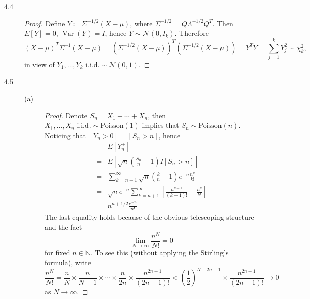 \documentclass{article}
\newcommand{\nn}{\mathbb{N}}
\DeclareMathOperator*{\Var}{Var}
\theoremstyle{definition}
\theoremstyle{plain}
\theoremstyle{remark}
\newtheorem*{rem}{Remark}
\begin{document}
\begin{description}
\begin{comment}
\begin{rem}
The more classical proof of the statement that the characteristic function of a random variable uniquely determines its distribution is given in Theorem 26.2 in \cite{billingsley95}, known as \emph{inversion and the uniqueness theorem}.
\end{rem}
\end{comment}

\item[4.4]
\begin{proof}
Define $Y \coloneqq \Sigma^{-1/2}(X - \mu)$, where $\Sigma^{-1/2} = Q\Lambda^{-1/2}Q^T$. Then $E[Y] = 0$, $\Var(Y) = I$, hence $Y \sim \mathcal{N}(0, I_k)$. Therefore
$$(X - \mu)^T\Sigma^{-1}(X - \mu) = (\Sigma^{-1/2}(X - \mu))^T(\Sigma^{-1/2}(X - \mu)) = Y^T Y = \sum_{j = 1}^k Y_j^2 \sim \chi_k^2,$$
in view of $Y_1, \ldots, Y_k \text{ i.i.d.} \sim \mathcal{N}(0, 1)$.
\end{proof}

\item[4.5]
\begin{description}
\item[(a)]
\begin{proof}
Denote $S_n = X_1 + \cdots + X_n$, then $X_1, \ldots, X_n \text{ i.i.d.} \sim \text{Poisson}(1)$ implies that $S_n \sim \text{Poisson}(n)$. Noticing that $[Y_n > 0] = [S_n > n]$, hence
\begin{align*}
& E[Y_n^+] \\
= & E\left[\sqrt{n}\left(\frac{S_n}{n} - 1\right)I[S_n > n]\right] \\
= & \sum_{k = n + 1}^\infty \sqrt{n} \left(\frac{k}{n} - 1\right) e^{-n}\frac{n^k}{k!} \\
= & \sqrt{n} e^{-n} \sum_{k = n + 1}^\infty \left[\frac{n^{k - 1}}{(k - 1)!} - \frac{n^k}{k!}
\right]\\
= & n^{n + 1/2}\frac{e^{-n}}{n!}
\end{align*}
The last equality holds because of the obvious telescoping structure and the fact 
\begin{equation*}
    \lim_{N \to \infty} \frac{n^N}{N!} = 0
\end{equation*}
for fixed $n \in \nn$. To see this (without applying the Stirling's formula), write
\begin{equation*}
    \frac{n^N}{N!} = \frac{n}{N} \times \frac{n}{N - 1} \times \cdots \times \frac{n}{2n}
    \times \frac{n^{2n - 1}}{(2n - 1)!} < \left(\frac{1}{2}\right)^{N - 2n + 1} \times 
    \frac{n^{2n - 1}}{(2n - 1)!} \to 0
\end{equation*}
as $N \to \infty$.
\end{proof}


\end{description}
\end{description}
\end{document}
